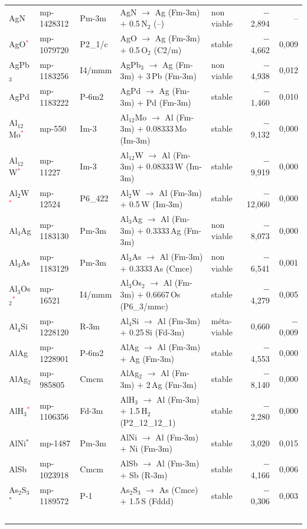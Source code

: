 \begin{longtable}{@{}ll l@{\hspace{4pt}} p{4.6cm} l@{\hspace{4pt}} rr@{}}
AgN & mp-1428312 & Pm-3m & AgN $\to$ Ag (Fm-3m) $+$ 0.5\,N$_{2}$ (--) & non viable & $-$2{,}894 & -- \\
AgO\textcolor{red}{$^*$} & mp-1079720 & P2\_1/c & AgO $\to$ Ag (Fm-3m) $+$ 0.5\,O$_{2}$ (C2/m) & stable & $-$4{,}662 & 0{,}009 \\
AgPb$_{3}$ & mp-1183256 & I4/mmm & AgPb$_{3}$ $\to$ Ag (Fm-3m) $+$ 3\,Pb (Fm-3m) & non viable & $-$4{,}938 & 0{,}012 \\
AgPd & mp-1183222 & P-6m2 & AgPd $\to$ Ag (Fm-3m) $+$ Pd (Fm-3m) & stable & $-$1{,}460 & 0{,}010 \\
Al$_{12}$Mo\textcolor{red}{$^*$} & mp-550 & Im-3 & Al$_{12}$Mo $\to$ Al (Fm-3m) $+$ 0.08333\,Mo (Im-3m) & stable & $-$9{,}132 & 0{,}000 \\
Al$_{12}$W\textcolor{red}{$^*$} & mp-11227 & Im-3 & Al$_{12}$W $\to$ Al (Fm-3m) $+$ 0.08333\,W (Im-3m) & stable & $-$9{,}919 & 0{,}000 \\
Al$_{2}$W\textcolor{red}{$^*$} & mp-12524 & P6\_422 & Al$_{2}$W $\to$ Al (Fm-3m) $+$ 0.5\,W (Im-3m) & stable & $-$12{,}060 & 0{,}000 \\
Al$_{3}$Ag & mp-1183130 & Pm-3m & Al$_{3}$Ag $\to$ Al (Fm-3m) $+$ 0.3333\,Ag (Fm-3m) & non viable & $-$8{,}073 & 0{,}000 \\
Al$_{3}$As & mp-1183129 & Pm-3m & Al$_{3}$As $\to$ Al (Fm-3m) $+$ 0.3333\,As (Cmce) & non viable & $-$6{,}541 & 0{,}001 \\
Al$_{3}$Os$_{2}$\textcolor{red}{$^*$} & mp-16521 & I4/mmm & Al$_{3}$Os$_{2}$ $\to$ Al (Fm-3m) $+$ 0.6667\,Os (P6\_3/mmc) & stable & $-$4{,}279 & 0{,}005 \\
Al$_{4}$Si & mp-1228120 & R-3m & Al$_{4}$Si $\to$ Al (Fm-3m) $+$ 0.25\,Si (Fd-3m) & m\'eta-viable & 0{,}660 & $-$0{,}009 \\
AlAg & mp-1228901 & P-6m2 & AlAg $\to$ Al (Fm-3m) $+$ Ag (Fm-3m) & stable & $-$4{,}553 & 0{,}000 \\
AlAg$_{2}$ & mp-985805 & Cmcm & AlAg$_{2}$ $\to$ Al (Fm-3m) $+$ 2\,Ag (Fm-3m) & stable & $-$8{,}140 & 0{,}000 \\
AlH$_{3}$\textcolor{red}{$^*$} & mp-1106356 & Fd-3m & AlH$_{3}$ $\to$ Al (Fm-3m) $+$ 1.5\,H$_{2}$ (P2\_12\_12\_1) & stable & $-$2{,}280 & 0{,}000 \\
AlNi$^*$ & mp-1487 & Pm-3m & AlNi $\to$ Al (Fm-3m) $+$ Ni (Fm-3m) & stable & 3{,}020 & 0{,}015 \\
AlSb & mp-1023918 & Cmcm & AlSb $\to$ Al (Fm-3m) $+$ Sb (R-3m) & stable & $-$4{,}166 & 0{,}006 \\
As$_{2}$S$_{3}$$^*$ & mp-1189572 & P-1 & As$_{2}$S$_{3}$ $\to$ As (Cmce) $+$ 1.5\,S (Fddd) & stable & $-$0{,}306 & 0{,}003 \\
$$
\end{longtable}
